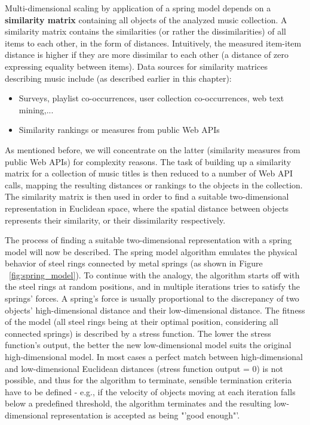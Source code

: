 Multi-dimensional scaling by application of a spring model depends on a \textbf{similarity matrix} containing all objects of the analyzed music collection. A similarity matrix contains the similarities (or rather the dissimilarities) of all items to each other, in the form of distances. Intuitively, the measured item-item distance is higher if they are more dissimilar to each other (a distance of zero expressing equality between items). Data sources for similarity matrices describing music include 
(as described earlier in this chapter):
\begin{itemize}
	\item Surveys, playlist co-occurrences, user collection co-occurrences, web text mining,... 
	\item Similarity rankings or measures from public Web APIs
\end{itemize}
As mentioned before, we will concentrate on the latter (similarity measures from public Web APIs) for complexity reasons. The task of building up a similarity matrix for a collection of music titles is then reduced to a number of Web API calls, mapping the resulting distances or rankings to the objects in the collection. The similarity matrix is then used in order to find a suitable two-dimensional representation in Euclidean space, where the spatial distance between objects represents their similarity, or their dissimilarity respectively.

The process of finding a suitable two-dimensional representation with a spring model will now be described. The spring model algorithm emulates the physical behavior of steel rings connected by metal springs (as shown in Figure ~\ref{fig:spring_model}). To continue with the analogy, the algorithm starts off with the steel rings at random positions, and in multiple iterations tries to satisfy the springs' forces. A spring's force is usually proportional to the discrepancy of two objects' high-dimensional distance and their low-dimensional distance. The fitness of the model (all steel rings being at their optimal position, considering all connected springs) is described by a stress function. The lower the stress function's output, the better the new low-dimensional model suits the original high-dimensional model. In most cases a perfect match between high-dimensional and low-dimensional Euclidean distances (stress function output = 0) is not possible, and thus for the algorithm to terminate, sensible termination criteria have to be defined - e.g., if the velocity of objects moving at each iteration falls below a predefined threshold, the algorithm terminates and the resulting low-dimensional representation is accepted as being "'good enough"'.

